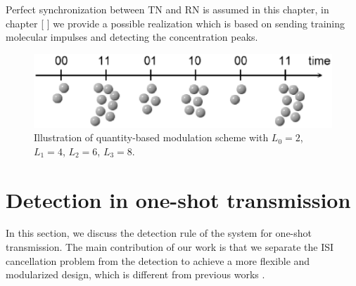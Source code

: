 Perfect synchronization between TN and RN is assumed in this chapter, in chapter [ ] we provide a possible realization which is based on sending training molecular impulses and detecting the concentration peaks.

\begin{figure}[htb]
\centering
\includegraphics[width=5.5in, keepaspectratio]{QM/modulation.eps}
\caption{Illustration of quantity-based modulation scheme with $L_0=2$, $L_1=4$, $L_2=6$, $L_3=8$.} \label{fig:modulation}
\end{figure}

\section{Detection in one-shot transmission}
In this section, we discuss the detection rule of the system for one-shot transmission. The main contribution of our work is that we separate the ISI cancellation problem from the detection to achieve a more flexible and modularized design, which is different from previous works \cite{ICC_Meng}.


